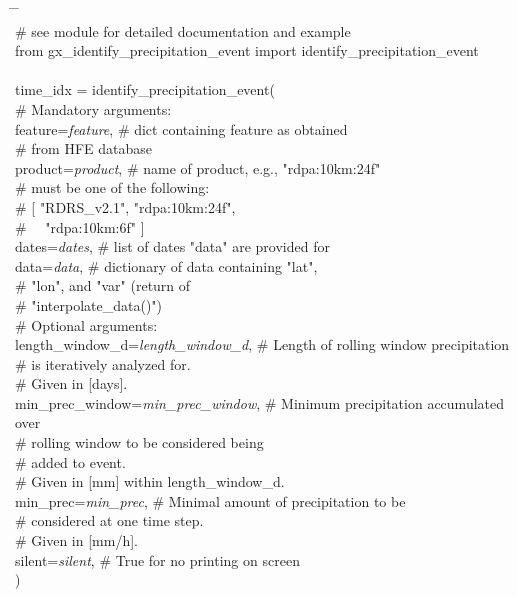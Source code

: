 \documentclass[10pt,a4paper,titlepage,parskip]{scrartcl}
\newenvironment{ttfont}{\fontfamily{\ttdefault}\selectfont}{\par}
\newcommand{\GRAU}[1]{\textcolor{ufzgray2}{#1}}
\begin{document}
\begin{framed}
	\vspace*{-1.2cm}
	\begin{ttfont}
		\begin{tabbing}
			\hspace{1.0cm} \= \hspace{6.2cm} \= \kill \\[4pt]
			\GRAU{\# see module for detailed documentation and example}\\
			from gx\_identify\_precipitation\_event import identify\_precipitation\_event\\
			\\
			time\_idx = identify\_precipitation\_event(\\
			\> \GRAU{\# Mandatory arguments:}\\
			\> feature=\textit{feature}, \> \GRAU{\# dict containing feature as obtained }\\
			\> \> \GRAU{\# from HFE database}\\
			\> product=\textit{product}, \> \GRAU{\# name of product, e.g., "rdpa:10km:24f"}\\
			\> \> \GRAU{\# must be one of the following: }\\
			\> \> \GRAU{\# [ "RDRS\_v2.1", "rdpa:10km:24f", }\\
			\> \> \GRAU{\# \ \ "rdpa:10km:6f" ]}\\
			\> dates=\textit{dates}, \> \GRAU{\# list of dates "data" are provided for}\\
			\> data=\textit{data}, \> \GRAU{\# dictionary of data containing "lat", }\\
			\> \> \GRAU{\# "lon", and "var" (return of }\\
			\> \> \GRAU{\# "interpolate\_data()")}\\
			\> \GRAU{\# Optional arguments:}\\
			\> length\_window\_d=\textit{length\_window\_d}, \> \GRAU{\# Length of rolling window precipitation }\\
			\> \> \GRAU{\# is iteratively analyzed for.}\\
			\> \> \GRAU{\# Given in [days].}\\
			\> min\_prec\_window=\textit{min\_prec\_window}, \> \GRAU{\# Minimum precipitation accumulated over }\\
			\> \> \GRAU{\# rolling window to be considered being}\\
			\> \> \GRAU{\# added to event. }\\
			\> \> \GRAU{\# Given in [mm] within length\_window\_d.}\\
			\> min\_prec=\textit{min\_prec}, \> \GRAU{\# Minimal amount of precipitation to be  }\\
			\> \> \GRAU{\# considered at one time step.  }\\
			\> \> \GRAU{\# Given in [mm/h].}\\
			\> silent=\textit{silent}, \> \GRAU{\# True for no printing on screen}\\
			\> ) \> 
		\end{tabbing}
	\end{ttfont}
	\vspace*{-0.3cm}
\end{framed}
\end{document}
